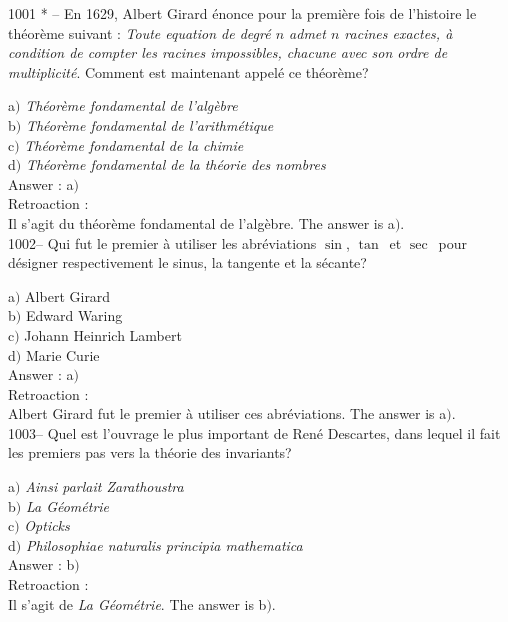 ﻿\documentclass[letterpaper, 12pt]{article}
\begin{document}
1001 * -- En 1629, Albert Girard \'enonce pour la premi\`ere fois de
l'histoire le th\'eor\`eme suivant : {\sl Toute equation de
degr\'e $n$ admet $n$ racines exactes, \`a condition de compter les
racines impossibles, chacune avec son ordre de multiplicit\'e}.
Comment est maintenant appel\'e ce th\'eor\`eme?

a$)$ {\sl Th\'eor\`eme fondamental de l'alg\`ebre} \\
b$)$ {\sl Th\'eor\`eme fondamental de l'arithm\'etique} \\
c$)$ {\sl Th\'eor\`eme fondamental de la chimie} \\
d$)$ {\sl Th\'eor\`eme fondamental de la th\'eorie des nombres}\\

Answer : a$)$\\

Retroaction : \\
Il s'agit du th\'eor\`eme fondamental de l'alg\`ebre.
The answer is a$)$.\\

1002-- Qui fut le premier \`a utiliser les abr\'eviations
\og$\sin$\fg, \og$\tan$\fg\ et \og$\sec$\fg\ pour d\'esigner
respectivement le sinus, la tangente et la s\'ecante?

a$)$ Albert Girard \\
b$)$ Edward Waring \\
c$)$ Johann Heinrich Lambert \\
d$)$ Marie Curie\\

Answer : a$)$\\

Retroaction : \\
Albert Girard fut le premier \`a utiliser ces abr\'eviations.
The answer is a$)$.\\

1003-- Quel est l'ouvrage le plus important de Ren\'e Descartes,
dans lequel il fait les premiers pas vers la th\'eorie des
invariants?

a$)$ {\sl Ainsi parlait Zarathoustra} \\
b$)$ {\sl La G\'eom\'etrie} \\
c$)$ {\sl Opticks} \\
d$)$ {\sl Philosophiae naturalis principia mathematica}\\

Answer : b$)$\\

Retroaction : \\
Il s'agit de {\sl La G\'eom\'etrie}.
The answer is b$)$.\\
\end{document}

